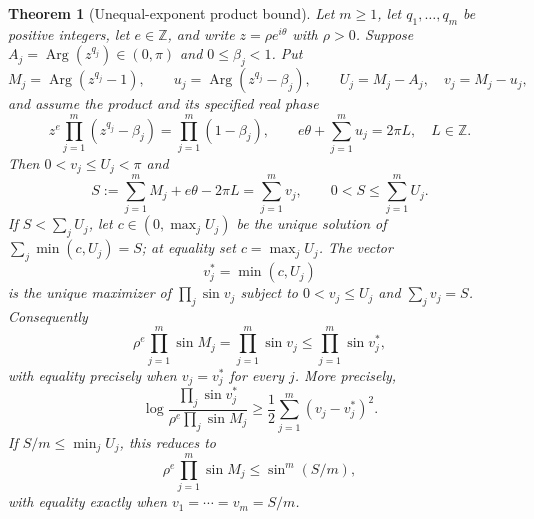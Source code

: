 \documentclass[11pt,a4paper]{article}
\newtheorem{theorem}{Theorem}[section]
\theoremstyle{definition}
\theoremstyle{remark}
\numberwithin{equation}{section}
\begin{document}
\begin{theorem}[Unequal-exponent product bound]\label{thm:unequal-product-bound}
Let $m\ge1$, let $q_1,\ldots,q_m$ be positive integers, let $e\in\mathbb Z$,
and write $z=\rho e^{i\theta}$ with $\rho>0$. Suppose
$A_j=\operatorname{Arg}(z^{q_j})\in(0,\pi)$ and $0\le\beta_j<1$.
Put
\[
 M_j=\operatorname{Arg}(z^{q_j}-1),\qquad
 u_j=\operatorname{Arg}(z^{q_j}-\beta_j),\qquad
 U_j=M_j-A_j,\quad v_j=M_j-u_j,
\]
and assume the product and its specified real phase
\begin{equation}\label{eq:unequal-product-phase}
 z^e\prod_{j=1}^m(z^{q_j}-\beta_j)=\prod_{j=1}^m(1-\beta_j),
 \qquad e\theta+\sum_{j=1}^m u_j=2\pi L,\quad L\in\mathbb Z.
\end{equation}
Then $0<v_j\le U_j<\pi$ and
\[
 S:=\sum_{j=1}^mM_j+e\theta-2\pi L=\sum_{j=1}^m v_j,
 \qquad 0<S\le\sum_{j=1}^mU_j.
\]
If $S<\sum_jU_j$, let $c\in(0,\max_jU_j)$ be the unique solution of
$\sum_j\min(c,U_j)=S$; at equality set $c=\max_jU_j$.
The vector
\[
 v_j^*=\min(c,U_j)
\]
is the unique maximizer of $\prod_j\sin v_j$ subject to
$0<v_j\le U_j$ and $\sum_jv_j=S$. Consequently
\begin{equation}\label{eq:unequal-sharp-product}
 \rho^e\prod_{j=1}^m\sin M_j
   =\prod_{j=1}^m\sin v_j
   \le\prod_{j=1}^m\sin v_j^*,
\end{equation}
with equality precisely when $v_j=v_j^*$ for every $j$. More precisely,
\begin{equation}\label{eq:unequal-quadratic-deficit}
 \log\frac{\prod_j\sin v_j^*}{\rho^e\prod_j\sin M_j}
       \ge\frac12\sum_{j=1}^m(v_j-v_j^*)^2.
\end{equation}
If $S/m\le\min_jU_j$, this reduces to
\[
 \rho^e\prod_{j=1}^m\sin M_j\le\sin^m(S/m),
\]
with equality exactly when $v_1=\cdots=v_m=S/m$.
\end{theorem}
\end{document}
